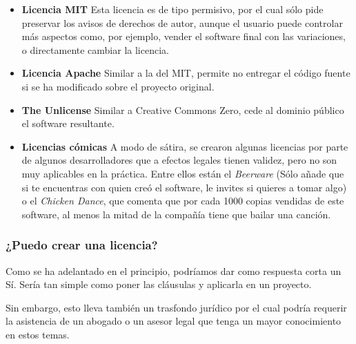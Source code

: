 \begin{itemize}
	\item \textbf{Licencia MIT} Esta licencia es de tipo permisivo, por el cual sólo pide preservar los avisos de derechos de autor, aunque el usuario puede controlar más aspectos como, por ejemplo, vender el software final con las variaciones, o directamente cambiar la licencia. 
	\item \textbf{Licencia Apache} Similar a la del MIT, permite no entregar el código fuente si se ha modificado sobre el proyecto original.
	\item \textbf{The Unlicense} Similar a Creative Commons Zero, cede al dominio público el software resultante.
	\item \textbf{Licencias cómicas} A modo de sátira, se crearon algunas licencias por parte de algunos desarrolladores que a efectos legales tienen validez, pero no son muy aplicables en la práctica.
	 Entre ellos están el \textit{Beerware} (Sólo añade que si te encuentras con quien creó el software, le invites si quieres a tomar algo) o el \textit{Chicken Dance}, que comenta que por cada 1000 copias vendidas de este software, al menos la mitad de la compañía tiene que bailar una canción.
\end{itemize}

\subsubsection{¿Puedo crear una licencia?}
Como se ha adelantado en el principio, podríamos dar como respuesta corta un Sí. Sería tan simple como poner las cláusulas y aplicarla en un proyecto. 

Sin embargo, esto lleva también un trasfondo jurídico por el cual podría requerir la asistencia de un abogado o un asesor legal que tenga un mayor conocimiento en estos temas.